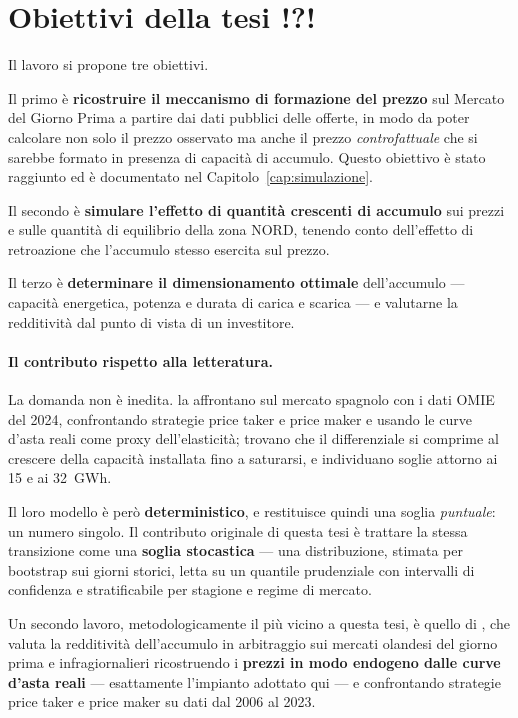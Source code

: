 \section{Obiettivi della tesi !?!}
\label{sec:obiettivi}


Il lavoro si propone tre obiettivi.

Il primo \`e \textbf{ricostruire il meccanismo di formazione del prezzo} sul Mercato del
Giorno Prima a partire dai dati pubblici delle offerte, in modo da poter calcolare non solo
il prezzo osservato ma anche il prezzo \emph{controfattuale} che si sarebbe formato in
presenza di capacit\`a di accumulo. Questo obiettivo \`e stato raggiunto ed \`e documentato
nel Capitolo~\ref{cap:simulazione}.

Il secondo \`e \textbf{simulare l'effetto di quantit\`a crescenti di accumulo} sui prezzi e
sulle quantit\`a di equilibrio della zona NORD, tenendo conto dell'effetto di retroazione che
l'accumulo stesso esercita sul prezzo.

Il terzo \`e \textbf{determinare il dimensionamento ottimale} dell'accumulo — capacit\`a
energetica, potenza e durata di carica e scarica — e valutarne la redditivit\`a dal punto di
vista di un investitore.

\paragraph{Il contributo rispetto alla letteratura.} La domanda non \`e inedita.
\textcite{alonsoperez2026storage} la affrontano sul mercato spagnolo con i dati OMIE del 2024,
confrontando strategie price taker e price maker e usando le curve d'asta reali come proxy
dell'elasticit\`a; trovano che il differenziale si comprime al crescere della capacit\`a
installata fino a saturarsi, e individuano soglie attorno ai 15 e ai 32~GWh.

Il loro modello \`e per\`o \textbf{deterministico}, e restituisce quindi una soglia
\emph{puntuale}: un numero singolo. Il contributo originale di questa tesi \`e trattare la
stessa transizione come una \textbf{soglia stocastica} — una distribuzione, stimata per
bootstrap sui giorni storici, letta su un quantile prudenziale con intervalli di confidenza e
stratificabile per stagione e regime di mercato.

Un secondo lavoro, metodologicamente il pi\`u vicino a questa tesi, \`e quello di
\textcite{veenstra2025profitability}, che valuta la redditivit\`a dell'accumulo in arbitraggio
sui mercati olandesi del giorno prima e infragiornalieri ricostruendo i \textbf{prezzi in modo
endogeno dalle curve d'asta reali} — esattamente l'impianto adottato qui — e confrontando
strategie price taker e price maker su dati dal 2006 al 2023.


